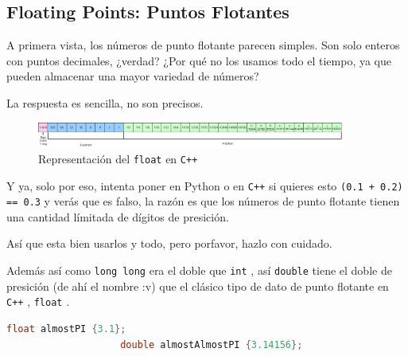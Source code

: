 \documentclass[12pt, fleqn]{report}                             %
\theoremstyle{break}                                            %
\newcommand{\textCode}[1]  { \texttt{#1} }                      %
\newcommand \Cpp  {\textCode{C++} }                               %
\begin{document}
            \clearpage
            \subsection{Floating Points: Puntos Flotantes}

                A primera vista, los números de punto flotante parecen simples.
                Son solo enteros con puntos decimales, ¿verdad? 
                ¿Por qué no los usamos todo el tiempo, ya que pueden almacenar una mayor variedad de números?

                La respuesta es sencilla, no son precisos.

                \begin{figure}[h]
                    \centering
                    \includegraphics[width=0.9\textwidth]{IEEEFP}
                    \caption{\footnotesize{Representación del \textCode{float} en \Cpp}}
                \end{figure}

                Y ya, solo por eso, intenta poner en Python o en \Cpp si quieres esto 
                \textCode{(0.1 + 0.2) == 0.3} y verás que es falso, la razón es que los números de punto
                flotante tienen una cantidad límitada de dígitos de presición.

                Así que esta bien usarlos y todo, pero porfavor, hazlo con cuidado.

                Además así como \textCode{long long} era el doble que \textCode{int}, así
                \textCode{double} tiene el doble de presición (de ahí el nombre :v) que el clásico
                tipo de dato de punto flotante en \Cpp, \textCode{float}.

                \begin{lstlisting}[language=C++, gobble=20]
                    float almostPI {3.1};
                    double almostAlmostPI {3.14156};
                \end{lstlisting}
                

\end{document}
